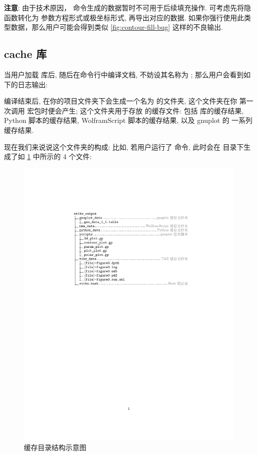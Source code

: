 \documentclass[
  hyper, lang=cn, 
  class=l3dox, 
]{../../zlatex/code/ztex}
\begin{document}
\textbf{注意}: 由于技术原因，\cmd{\ContourPlot} 命令生成的数据暂时不可用于后续填充操作. 可考虑先将隐函数转化为
参数方程形式或极坐标形式, 再导出对应的数据. 如果你强行使用此类型数据，那么用户可能会得到类似 \cref{fig:contour-fill-bug} 
这样的不良输出.


\clearpage
\subsection{cache 库}
当用户加载  库后, 随后在命令行中编译文档, 不妨设其名称为 ; 那么用户会看到如下的日志输出:


\def\exampleUR{}


编译结束后, 在你的项目文件夹下会生成一个名为  的文件夹, 这个文件夹在你
第一次调用  宏包时便会产生; 这个文件夹用于存放 \zTikZ{} 的缓存文件: 包括 \TikZ{} 
 库的缓存结果, Python 脚本的缓存结果, WolframScript 脚本的缓存结果, 以及 gnuplot 的 
一系列缓存结果.

现在我们来说说这个文件夹的构成: 比如, 若用户运行了 \cmd{\Plot} 命令, 此时会在  
目录下生成了如 \cref{fig:zTikZ-directory} 中所示的 4 个文件:

\begin{figure}[!htb]
  \centering
  \includegraphics[width=.9\linewidth]{./support/pics/directory_tree_crop.pdf}
  \caption{\zTikZ{} 缓存目录结构示意图}
  \label{fig:zTikZ-directory}
\end{figure}
\end{document}
